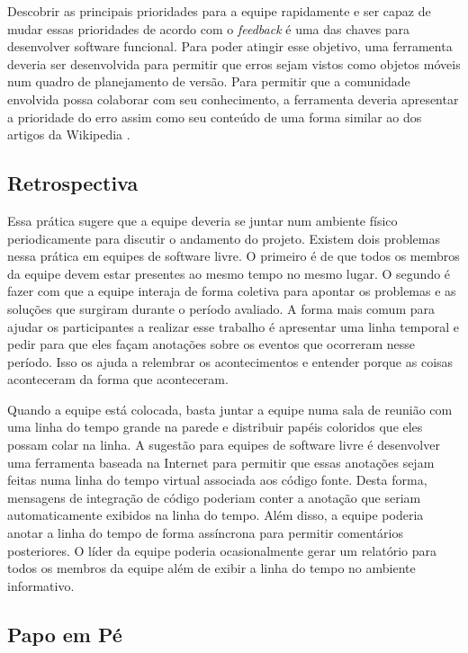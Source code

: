 Descobrir as principais prioridades para a equipe rapidamente e ser
capaz de mudar essas prioridades de acordo com o \emph{feedback} é uma
das chaves para desenvolver software funcional. Para poder atingir
esse objetivo, uma ferramenta deveria ser desenvolvida para permitir
que erros sejam vistos como objetos móveis num quadro de planejamento
de versão. Para permitir que a comunidade envolvida possa colaborar
com seu conhecimento, a ferramenta deveria apresentar a prioridade do
erro assim como seu conteúdo de uma forma similar ao dos artigos da
Wikipedia \cite{Surowiecki2004,Tapscott2006,Benkler2006}.

\subsection{Retrospectiva}
\label{subsec:retrospect}

Essa prática sugere que a equipe deveria se juntar num ambiente físico
periodicamente para discutir o andamento do projeto. Existem dois
problemas nessa prática em equipes de software livre. O primeiro é de
que todos os membros da equipe devem estar presentes ao mesmo tempo no
mesmo lugar. O segundo é fazer com que a equipe interaja de forma
coletiva para apontar os problemas e as soluções que surgiram durante
o período avaliado. A forma mais comum para ajudar os participantes a
realizar esse trabalho é apresentar uma linha temporal e pedir para
que eles façam anotações sobre os eventos que ocorreram nesse
período. Isso os ajuda a relembrar os acontecimentos e entender porque
as coisas aconteceram da forma que aconteceram.

Quando a equipe está colocada, basta juntar a equipe numa sala de
reunião com uma linha do tempo grande na parede e distribuir papéis
coloridos que eles possam colar na linha. A sugestão para equipes de
software livre é desenvolver uma ferramenta baseada na Internet para
permitir que essas anotações sejam feitas numa linha do tempo virtual
associada aos código fonte. Desta forma, mensagens de integração de
código poderiam conter a anotação que seriam automaticamente exibidos
na linha do tempo. Além disso, a equipe poderia anotar a linha do
tempo de forma assíncrona para permitir comentários posteriores. O
líder da equipe poderia ocasionalmente gerar um relatório para todos
os membros da equipe além de exibir a linha do tempo no ambiente
informativo.

\subsection{Papo em Pé}
\label{subsec:stand-up}

